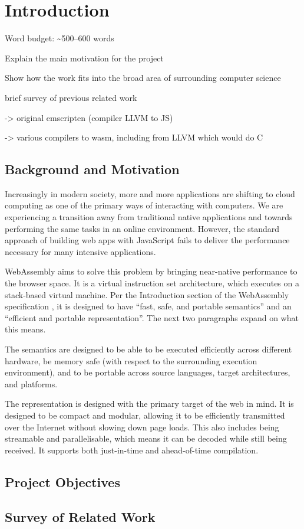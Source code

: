 \documentclass[00-main.tex]{subfiles}
\begin{document}
\chapter{Introduction}

\begin{Comment}
Word budget: \textasciitilde 500--600 words
\end{Comment}

\begin{Comment}
Explain the main motivation for the project

Show how the work fits into the broad area of surrounding computer science

brief survey of previous related work

-> original emscripten (compiler LLVM to JS)

-> various compilers to wasm, including from LLVM which would do C
\end{Comment}

\section{Background and Motivation}

Increasingly in modern society, more and more applications are shifting to cloud computing as one of the primary ways of interacting with computers.
We are experiencing a transition away from traditional native applications and towards performing the same tasks in an online environment.
However, the standard approach of building web apps with JavaScript fails to deliver the performance necessary for many intensive applications.

WebAssembly aims to solve this problem by bringing near-native performance to the browser space.
It is a virtual instruction set architecture, which executes on a stack-based virtual machine.
Per the Introduction section of the WebAssembly specification , it is designed to have ``fast, safe, and portable semantics'' and an ``efficient and portable representation''.
The next two paragraphs expand on what this means.

The semantics are designed to be able to be executed efficiently across different hardware, be memory safe (with respect to the surrounding execution environment), and to be portable across source languages, target architectures, and platforms.

The representation is designed with the primary target of the web in mind.
It is designed to be compact and modular, allowing it to be efficiently transmitted over the Internet without slowing down page loads.
This also includes being streamable and parallelisable, which means it can be decoded while still being received.
It supports both just-in-time and ahead-of-time compilation.


\section{Project Objectives}



\section{Survey of Related Work}
\end{document}
